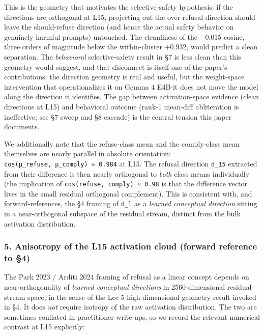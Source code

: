 \documentclass[
  11pt,
]{article}
\begin{document}
This is the geometry that motivates the selective-safety hypothesis: if
the directions are orthogonal at L15, projecting out the over-refusal
direction should leave the should-refuse direction (and hence the actual
safety behavior on genuinely harmful prompts) untouched. The cleanliness
of the −0.015 cosine, three orders of magnitude below the within-cluster
+0.932, would predict a clean separation. The \emph{behavioral}
selective-safety result in §7 is less clean than this geometry would
suggest, and that disconnect is itself one of the paper's contributions:
the direction geometry is real and useful, but the weight-space
intervention that operationalizes it on Gemma 4 E4B-it does not move the
model along the direction it identifies. The gap between
activation-space evidence (clean directions at L15) and behavioral
outcome (rank-1 mean-diff abliteration is ineffective; see §7 sweep and
§8 cascade) is the central tension this paper documents.

We additionally note that the refuse-class mean and the comply-class
mean themselves are nearly parallel in absolute orientation:
\texttt{cos(μ\_refuse,\ μ\_comply)\ ≈\ 0.984} at L15. The refusal
direction \texttt{d\_15} extracted from their difference is then nearly
orthogonal to \emph{both} class means individually (the implication of
\texttt{cos(refuse,\ comply)\ ≈\ 0.98} is that the difference vector
lives in the small residual orthogonal complement). This is consistent
with, and forward-references, the §4 framing of \texttt{d\_l} as a
\emph{learned conceptual direction} sitting in a near-orthogonal
subspace of the residual stream, distinct from the bulk activation
distribution.

\subsubsection{5. Anisotropy of the L15 activation cloud (forward
reference to
§4)}\label{anisotropy-of-the-l15-activation-cloud-forward-reference-to-4}

The Park 2023 / Arditi 2024 framing of refusal as a linear concept
depends on near-orthogonality of \emph{learned conceptual directions} in
2560-dimensional residual-stream space, in the sense of the Lec 5
high-dimensional geometry result invoked in §4. It does \emph{not}
require isotropy of the raw activation distribution. The two are
sometimes conflated in practitioner write-ups, so we record the relevant
numerical contrast at L15 explicitly:
\end{document}
